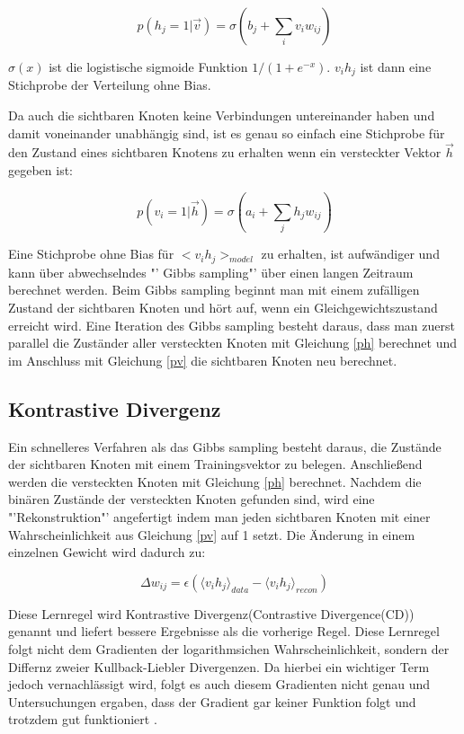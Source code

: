 \documentclass[12pt]{article}
\begin{document}
\begin{equation}
p(h_j = 1 | \vec{v}) = \sigma (b_j + \sum_{i} v_i w_{ij})
\label{ph}
\end{equation}

$\sigma(x)$ ist die logistische sigmoide Funktion $1/(1+e^{-x})$. $v_ih_j$ ist dann eine Stichprobe der Verteilung ohne Bias.

Da auch die sichtbaren Knoten keine Verbindungen untereinander haben und damit voneinander unabhängig sind, ist es genau so einfach eine Stichprobe für den Zustand eines sichtbaren Knotens zu erhalten wenn ein versteckter Vektor $\vec{h}$ gegeben ist:

\begin{equation}
p(v_i =1 | \vec{h}) = \sigma (a_i + \sum_{j} h_j w_{ij})
\label{pv}
\end{equation}

Eine Stichprobe ohne Bias für $<v_i h_j>_{model}$ zu erhalten, ist aufwändiger und kann über abwechselndes "' Gibbs sampling"' über einen langen Zeitraum berechnet werden. Beim Gibbs sampling beginnt man mit einem zufälligen Zustand der sichtbaren Knoten und hört auf, wenn ein Gleichgewichtszustand erreicht wird. Eine Iteration des Gibbs sampling besteht daraus, dass man zuerst parallel die Zuständer aller versteckten Knoten mit Gleichung \ref{ph} berechnet und im Anschluss mit Gleichung \ref{pv} die sichtbaren Knoten neu berechnet.

\subsection{Kontrastive Divergenz}

Ein schnelleres Verfahren als das Gibbs sampling besteht daraus, die Zustände der sichtbaren Knoten mit einem Trainingsvektor zu belegen. Anschließend werden die versteckten Knoten mit Gleichung \ref{ph} berechnet. Nachdem die binären Zustände der versteckten Knoten gefunden sind, wird eine "'Rekonstruktion"' angefertigt indem man jeden sichtbaren Knoten mit einer Wahrscheinlichkeit aus Gleichung \ref{pv} auf 1 setzt. Die Änderung in einem einzelnen Gewicht wird dadurch zu:

\begin{equation}
\Delta w_{ij} = \epsilon \left( \langle v_i h_j\rangle_{data} - \langle v_i h_j \rangle_{recon}\right)
\end{equation}

Diese Lernregel wird Kontrastive Divergenz(Contrastive Divergence(CD)) genannt und liefert bessere Ergebnisse als die vorherige Regel. Diese Lernregel folgt nicht dem Gradienten der logarithmsichen Wahrscheinlichkeit, sondern der Differnz zweier Kullback-Liebler Divergenzen. Da hierbei ein wichtiger Term jedoch vernachlässigt wird, folgt es auch diesem Gradienten nicht genau und Untersuchungen ergaben, dass der Gradient gar keiner Funktion folgt und trotzdem gut funktioniert \cite{noconv}. 
\end{document}
